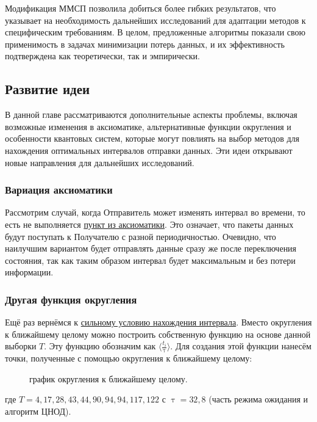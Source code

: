 \documentclass[12pt]{report}
\let\tau\uptau
\begin{document}
Модификация ММСП позволила добиться более гибких результатов, что указывает на необходимость дальнейших исследований для адаптации методов к специфическим требованиям. В целом, предложенные алгоритмы показали свою применимость в задачах минимизации потерь данных, и их эффективность подтверждена как теоретически, так и эмпирически.

\subsection{Развитие идеи}
В данной главе рассматриваются дополнительные аспекты проблемы, включая возможные изменения в аксиоматике, альтернативные функции округления и особенности квантовых систем, которые могут повлиять на выбор методов для нахождения оптимальных интервалов отправки данных. Эти идеи открывают новые направления для дальнейших исследований.

\subsubsection{Вариация аксиоматики}
Рассмотрим случай, когда Отправитель может изменять интервал во времени, то есть не выполняется \hyperref[sec:c]{пункт из аксиоматики}. Это означает, что пакеты данных будут поступать к Получателю с разной периодичностью. Очевидно, что наилучшим вариантом будет отправлять данные сразу же после переключения состояния, так как таким образом интервал будет максимальным и без потери информации.

\subsubsection{Другая функция округления}
Ещё раз вернёмся к \hyperref[sec:GCF]{сильному условию нахождения интервала}. Вместо округления к ближайшему целому можно построить собственную функцию на основе данной выборки $T$. Эту функцию обозначим как $\langle\frac{t_i}{\tau}\rangle$. Для создания этой функции нанесём точки, полученные с помощью округления к ближайшему целому:

\begin{figure}[ht]
    \centering
    \caption{график округления к ближайшему целому.}
\end{figure}
\newpage
где $T = {4, 17, 28, 43, 44, 90, 94, 94, 117, 122}$ с $\tau = 32,8$ (часть режима ожидания и алгоритм ЦНОД).
\end{document}
